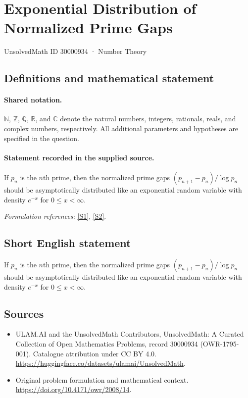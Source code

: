 \documentclass[11pt]{article}
\newcommand{\sref}[2]{\hyperlink{source:#1:#2}{[S#2]}}
\begin{document}
\setcounter{section}{30000933}
\section{Exponential Distribution of Normalized Prime Gaps}\label{30000934}
{\small UnsolvedMath ID 30000934 · Number Theory}
\subsection{Definitions and mathematical statement}

\paragraph{Shared notation.}$\mathbb N$, $\mathbb Z$, $\mathbb Q$, $\mathbb R$, and $\mathbb C$ denote the natural numbers, integers, rationals, reals, and complex numbers, respectively. All additional parameters and hypotheses are specified in the question.


\paragraph{Statement recorded in the supplied source.}
If $p_n$ is the $n$th prime, then the normalized prime gaps $(p_{n+1}-p_n)/\log p_n$ should be asymptotically distributed like an exponential random variable with density $e^{-x}$ for $0\leq x<\infty$.
\par\smallskip\textit{Formulation references:} \sref{30000934}{1}, \sref{30000934}{2}.
\subsection{Short English statement}
If $p_n$ is the $n$th prime, then the normalized prime gaps $(p_{n+1}-p_n)/\log p_n$ should be asymptotically distributed like an exponential random variable with density $e^{-x}$ for $0\leq x<\infty$.
\subsection{Sources}
\begin{itemize}
\item[\hypertarget{source:30000934:1}{S1}] ULAM.AI and the UnsolvedMath Contributors, UnsolvedMath: A Curated Collection of Open Mathematics Problems, record 30000934 (OWR-1795-001). Catalogue attribution under CC BY 4.0.
\url{https://huggingface.co/datasets/ulamai/UnsolvedMath}.
\item[\hypertarget{source:30000934:2}{S2}] Original problem formulation and mathematical context.
\url{https://doi.org/10.4171/owr/2008/14}.
\end{itemize}
\label{end:30000934}
\end{document}
